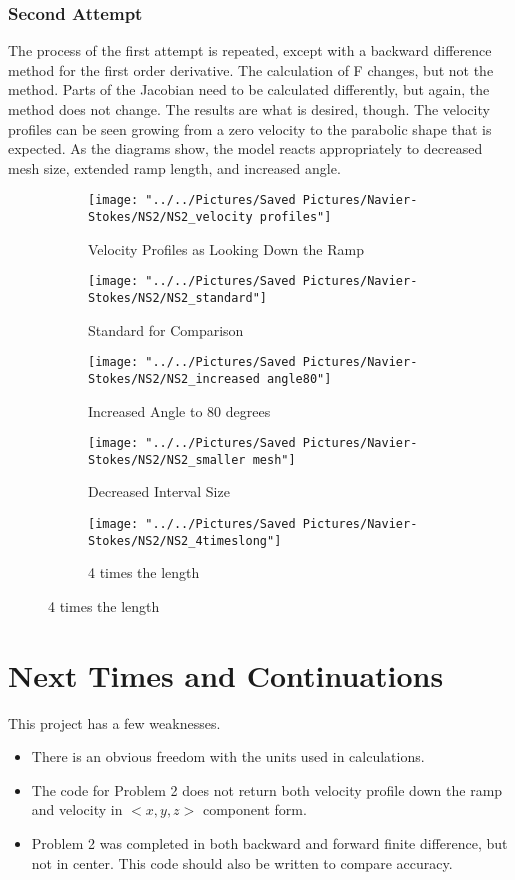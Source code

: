 \documentclass{article}
\begin{document}
\subsubsection{Second Attempt}
The process of the first attempt is repeated, except with a backward difference method for the first order derivative.
The calculation of F changes, but not the method. Parts of the Jacobian need to be calculated differently, but again, the method does not change. The results are what is desired, though. The velocity profiles can be seen growing from a zero velocity to the parabolic shape that is expected. As the diagrams show, the model reacts appropriately to decreased mesh size, extended ramp length, and increased angle.
\begin{figure}[h!]
\begin{subfigure}{0.4\linewidth}
	\centering
	\texttt{[image: "../../Pictures/Saved Pictures/Navier-Stokes/NS2/NS2\_velocity profiles"]}
	\caption{Velocity Profiles as Looking Down the Ramp}
	\label{fig:ns2velocity-profiles}
\end{subfigure}
\begin{subfigure}{0.4\linewidth}
	\centering
	\texttt{[image: "../../Pictures/Saved Pictures/Navier-Stokes/NS2/NS2\_standard"]}
	\caption{Standard for Comparison}
	\label{fig:ns2standard}
\end{subfigure}
\begin{subfigure}{0.4\linewidth}
	\centering
	\texttt{[image: "../../Pictures/Saved Pictures/Navier-Stokes/NS2/NS2\_increased angle80"]}
	\caption{Increased Angle to 80 degrees}
	\label{fig:ns2increased-angle80}
\end{subfigure}
\begin{subfigure}{0.4\linewidth}
	\centering
	\texttt{[image: "../../Pictures/Saved Pictures/Navier-Stokes/NS2/NS2\_smaller mesh"]}
	\caption{Decreased Interval Size }
	\label{fig:ns2smaller-mesh}
\end{subfigure}
\begin{subfigure}{0.4\linewidth}
	\centering
	\texttt{[image: "../../Pictures/Saved Pictures/Navier-Stokes/NS2/NS2\_4timeslong"]}
	\caption{4 times the length}
	\label{fig:ns24timeslong}
\end{subfigure}
\end{figure}
\section{Next Times and Continuations}
This project has a few weaknesses. 
\begin{itemize}
\item There is an obvious freedom with the units used in calculations.
\item The code for Problem 2 does not return both velocity profile down the ramp and velocity in $<x,y,z>$ component form.
\item Problem 2 was completed in both backward and forward finite difference, but not in center. This code should also be written to compare accuracy.
\end{itemize}
\end{document}
